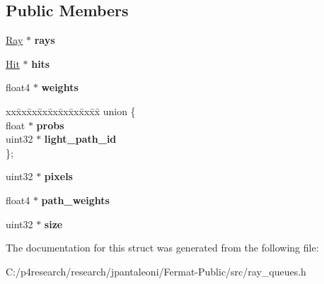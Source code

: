 \subsection*{Public Members}
\begin{DoxyCompactItemize}
\item 
\mbox{\label{struct_ray_queue_a9a8e80f4e03ecbcb721696f6f8cc3c03}} 
\hyperlink{struct_ray}{Ray} $\ast$ {\bfseries rays}
\item 
\mbox{\label{struct_ray_queue_ac8b8e660c40687e86eff43233e6a05e2}} 
\hyperlink{struct_hit}{Hit} $\ast$ {\bfseries hits}
\item 
\mbox{\label{struct_ray_queue_ac2efa3e54c1e5da271b42568ae729c75}} 
float4 $\ast$ {\bfseries weights}
\item 
\mbox{\label{struct_ray_queue_a432d6fa34e15c287c5a11f3a2502ea25}} 
\begin{tabbing}
xx\=xx\=xx\=xx\=xx\=xx\=xx\=xx\=xx\=\kill
union \{\\
\>float $\ast$ {\bfseries probs}\\
\>uint32 $\ast$ {\bfseries light\_path\_id}\\
\}; \\

\end{tabbing}\item 
\mbox{\label{struct_ray_queue_a52d425734e9d815d1049ef42555a8cfa}} 
uint32 $\ast$ {\bfseries pixels}
\item 
\mbox{\label{struct_ray_queue_a34cb634539ab39d00bce8bab6f61bf1c}} 
float4 $\ast$ {\bfseries path\+\_\+weights}
\item 
\mbox{\label{struct_ray_queue_afc5b8c5beb64c43d042c9a8696b23b7e}} 
uint32 $\ast$ {\bfseries size}
\end{DoxyCompactItemize}


The documentation for this struct was generated from the following file\+:\begin{DoxyCompactItemize}
\item 
C\+:/p4research/research/jpantaleoni/\+Fermat-\/\+Public/src/ray\+\_\+queues.\+h\end{DoxyCompactItemize}

